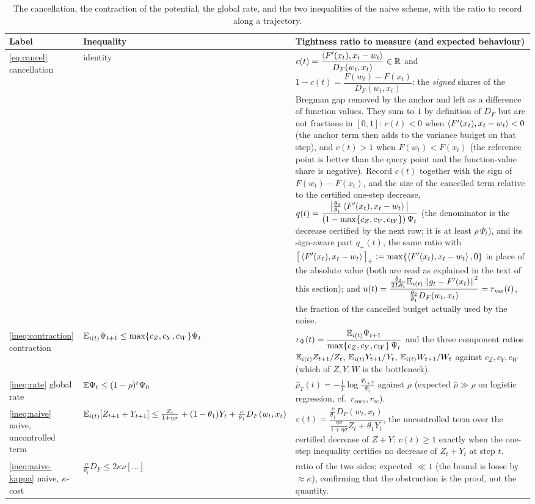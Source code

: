 \begin{table}[htbp]
\centering\small
\begin{tabular}{p{2.2cm}p{5.6cm}p{7.3cm}}
\hline
Label & Inequality & Tightness ratio to measure (and expected behaviour) \\
\hline
\eqref{eq:cancel} cancellation & identity & $c(t)=\dfrac{\left\langle F'(x_t), x_t-w_t \right\rangle}{D_F(w_t,x_t)}\in\mathbb{R}$ and $1-c(t)=\dfrac{F(w_t)-F(x_t)}{D_F(w_t,x_t)}$: the \emph{signed} shares of the Bregman gap removed by the anchor and left as a difference of function values. They sum to $1$ by definition of $D_F$ but are not fractions in $[0,1]$: $c(t)<0$ when $\left\langle F'(x_t), x_t-w_t \right\rangle<0$ (the anchor term then adds to the variance budget on that step), and $c(t)>1$ when $F(w_t)<F(x_t)$ (the reference point is better than the query point and the function-value share is negative). Record $c(t)$ together with the sign of $F(w_t)-F(x_t)$, and the size of the cancelled term relative to the certified one-step decrease, $q(t)=\dfrac{\big|\frac{\theta_2}{\theta_1}\left\langle F'(x_t), x_t-w_t \right\rangle\big|}{(1-\max\{c_Z,c_Y,c_W\})\,\Psi_t}$ (the denominator is the decrease certified by the next row; it is at least $\rho\,\Psi_t$), and its sign-aware part $q_+(t)$, the same ratio with $\big[\left\langle F'(x_t), x_t-w_t \right\rangle\big]_+:=\max\{\left\langle F'(x_t), x_t-w_t \right\rangle,0\}$ in place of the absolute value (both are read as explained in the text of this section); and $u(t)=\dfrac{\frac{\theta_2}{2L\theta_1}\mathbb{E}_{i(t)}\left\|g_t-F'(x_t)\right\|^2}{\frac{\theta_2}{\theta_1}D_F(w_t,x_t)}=r_{\mathrm{var}}(t)$, the fraction of the cancelled budget actually used by the noise. \\
\eqref{ineq:contraction} contraction & $\mathbb{E}_{i(t)}\Psi_{t+1}\le\max\{c_Z,c_Y,c_W\}\Psi_t$ & $r_\Psi(t)=\dfrac{\mathbb{E}_{i(t)}\Psi_{t+1}}{\max\{c_Z,c_Y,c_W\}\,\Psi_t}$ and the three component ratios $\mathbb{E}_{i(t)} Z_{t+1}/Z_t$, $\mathbb{E}_{i(t)} Y_{t+1}/Y_t$, $\mathbb{E}_{i(t)} W_{t+1}/W_t$ against $c_Z,c_Y,c_W$ (which of $Z,Y,W$ is the bottleneck). \\
\eqref{ineq:rate} global rate & $\mathbb{E}\Psi_t\le(1-\rho)^t\Psi_0$ & $\hat\rho_T(t)=-\frac1T\log\frac{\Psi_{t+T}}{\Psi_t}$ against $\rho$ (expected $\hat\rho\gg\rho$ on logistic regression, cf.\ $r_{\mathrm{coco}},r_{\mathrm{sc}}$). \\
\eqref{ineq:naive} naive, uncontrolled term & $\mathbb{E}_{i(t)}[Z_{t+1}+Y_{t+1}]\le\frac{Z_t}{1+\eta\sigma}+(1-\theta_1)Y_t+\frac\nu{\theta_1}D_F(w_t,x_t)$ & $v(t)=\dfrac{\frac\nu{\theta_1}D_F(w_t,x_t)}{\frac{\eta\sigma}{1+\eta\sigma}Z_t+\theta_1Y_t}$, the uncontrolled term over the certified decrease of $Z+Y$: $v(t)\ge1$ exactly when the one-step inequality certifies no decrease of $Z_t+Y_t$ at step $t$. \\
\eqref{ineq:naive-kappa} naive, $\kappa$-cost & $\frac\nu{\theta_1}D_F\le2\kappa\nu[\dots]$ & ratio of the two sides; expected $\ll1$ (the bound is loose by $\approx\kappa$), confirming that the obstruction is the proof, not the quantity. \\
\hline
\end{tabular}
\caption{The cancellation, the contraction of the potential, the global rate, and the two inequalities of the naive scheme, with the ratio to record along a trajectory.}
\label{tab:lk-instrument2}
\end{table}

